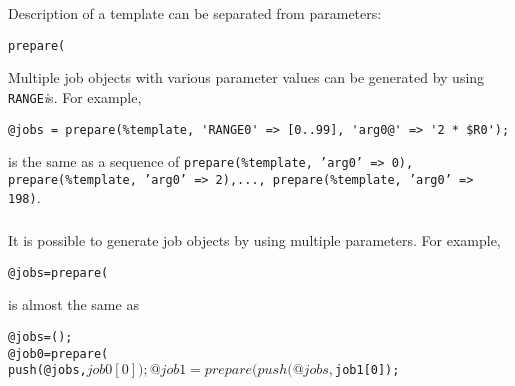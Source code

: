 \documentclass[a4paper,10pt]{report}
\begin{document}
Description of a template can be separated from parameters:
\begin{boxnote}
\begin{alltt}
%template = ('id' => '\textit{myjob}', 'exe' => '\textit{./myexe}');
prepare(%template, 'arg0@' => [10,20]);
\end{alltt}
\end{boxnote}
\vspace{\baselineskip}

Multiple job objects with various parameter values can be generated by using
\texttt{RANGE}\textit{i}s.  For example,
\begin{boxnote}
\begin{verbatim}
@jobs = prepare(%template, 'RANGE0' => [0..99], 'arg0@' => '2 * $R0');
\end{verbatim}
\end{boxnote}
\vspace{\baselineskip}
\noindent
is the same as a sequence of \texttt{prepare(\%template, 'arg0' => 0),
prepare(\%template, 'arg0' => 2),..., prepare(\%template, 'arg0' => 198)}.

\subsubsection{\advanced}

It is possible to generate job objects by using multiple parameters.
For example,
\begin{boxnote}
\begin{alltt}
%template = ('id' => '\textit{myjob}', 'exe' => '\textit{./myexe}');
@jobs = prepare(%template, 'arg0@' => [0,1], 'arg1@' => [2,3]);
\end{alltt}
\end{boxnote}
\vspace{\baselineskip}
\noindent
is almost the same as
\begin{boxnote}
\begin{alltt}
%template = ('id' => '\textit{myjob}', 'exe' => '\textit{./myexe}');
@jobs = ();
@job0 = prepare(%template, 'arg0' => '0', 'arg1' => '2');
push(@jobs, $job0[0]);
@job1 = prepare(%template, 'arg0' => '1', 'arg1' => '3');
push(@jobs, $job1[0]);
\end{alltt}
\end{boxnote}
\vspace{\baselineskip}
\end{document}
